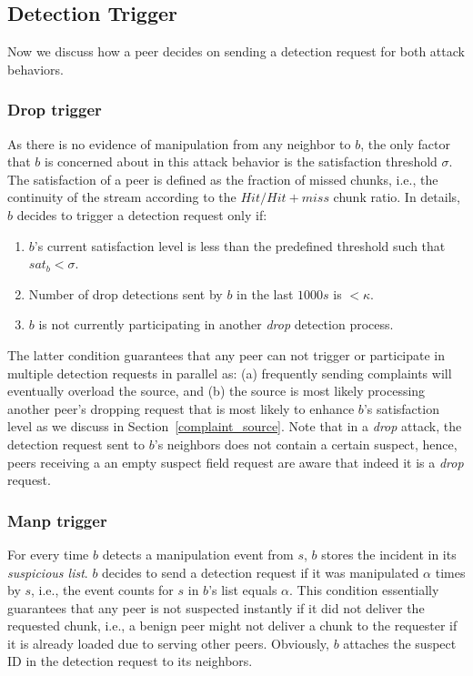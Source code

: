 \subsection{Detection Trigger}
\label{Detection-Trigger}
 Now we discuss how a peer decides on sending a detection request for both attack behaviors.
% 

\subsubsection*{Drop trigger}
As there is no evidence of manipulation from any neighbor to $b$, the only factor that $b$ is concerned about in this attack behavior is the satisfaction threshold $\sigma$.
The satisfaction of a peer is defined as the fraction of missed chunks, i.e., the continuity of the stream according to the $Hit/Hit+miss$ chunk ratio.
In details, $b$ decides to trigger a detection request only if:
\begin{enumerate}
 \item $b$'s current satisfaction level is less than the predefined threshold such that $sat_b < \sigma$.
 \item Number of drop detections sent by $b$ in the last $1000s$ is $< \kappa$.
 \item $b$ is not currently participating in another \textit{drop} detection process.
\end{enumerate}
The latter condition guarantees that any peer can not trigger or participate in multiple detection requests in parallel as: (a) frequently sending complaints will eventually overload the source,
and (b) the source is most likely processing another peer's dropping request that is most likely to enhance $b$'s satisfaction level as we discuss in Section~\ref{complaint_source}.
Note that in a \textit{drop} attack, the detection request sent to $b$'s neighbors does not contain a certain suspect, hence, peers receiving a an empty suspect field request are aware that indeed it is a \textit{drop} request.

\subsubsection*{Manp trigger}
For every time $b$ detects a manipulation event from $s$, $b$ stores the incident in its \textit{suspicious list}.
$b$ decides to send a detection request if it was manipulated $\alpha$ times by $s$, i.e., the event counts for $s$ in $b$'s list equals $\alpha$.
This condition essentially guarantees that any peer is not suspected instantly if it did not deliver the requested chunk, i.e., a benign peer might not deliver a chunk to the requester if it is already loaded due to serving other peers.
Obviously, $b$ attaches the suspect ID in the detection request to its neighbors.

